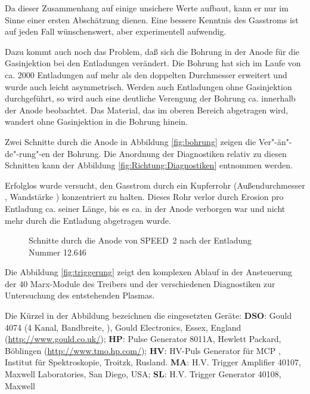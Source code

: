 \par
Da dieser Zusammenhang auf einige unsichere Werte aufbaut, kann er nur
im Sinne einer ersten Abschätzung dienen. Eine bessere Kenntnis des
Gasstroms ist auf jeden Fall wünschenswert, aber experimentell
aufwendig.
\par
Dazu kommt auch noch das Problem, daß sich die Bohrung in der Anode für
die Gasinjektion bei den Entladungen verändert. Die Bohrung hat sich im
Laufe von ca. 2000 Entladungen auf mehr als den doppelten Durchmesser
erweitert und wurde auch leicht asymmetrisch. Werden auch Entladungen
ohne Gasinjektion durchgeführt, so wird auch eine deutliche Verengung
der Bohrung ca.  innerhalb der Anode beobachtet. Das
Material, das im oberen Bereich abgetragen wird, wandert ohne
Gasinjektion in die Bohrung hinein.
\par
Zwei Schnitte durch die Anode in Abbildung \vref{fig:bohrung}
zeigen die Ver"-än"-de"-rung"-en der Bohrung. Die Anordnung der
Diagnostiken relativ zu diesen Schnitten kann der Abbildung
\vref{fig:Richtung:Diagnostiken} entnommen werden.
\par
Erfolglos wurde versucht, den Gasstrom durch ein Kupferrohr
(Außendurchmesser , Wandstärke )
konzentriert zu halten. Dieses Rohr verlor durch Erosion pro
Entladung ca.  seiner Länge, bis es ca. 
in der Anode verborgen war und nicht mehr durch die Entladung
abgetragen wurde.
%
\par
\begin{figure}[H]
  \center
  \caption{Schnitte durch die Anode von SPEED~2 nach der Entladung Nummer 12.646}
  \label{fig:bohrung}
\end{figure}
%
%
%
\par
Die Abbildung \vref{fig:triggerung} zeigt den komplexen Ablauf in der
Ansteuerung der 40 Marx-Module des Treibers und der verschiedenen Diagnostiken
zur Untersuchung des entstehenden Plasmas.
\par
Die Kürzel in der Abbildung bezeichnen die eingesetzten Geräte:
 {\bf DSO}: Gould 4074 (4 Kanal,  Bandbreite,
), Gould Electronics, Essex, England
(\url{http://www.gould.co.uk/});
 {\bf HP}: Pulse Generator 8011A,
Hewlett Packard, Böblingen (\url{http://www.tmo.hp.com/});
 {\bf HV}: HV-Puls Generator für MCP
\cite{sopkin:92}, Institut für Spektroskopie, Troitzk, Rusland.
 {\bf MA}: H.V. Trigger Amplifier 40107, Maxwell Laboratories, San
Diego, USA;
 {\bf SL}: H.V. Trigger Generator 40108, Maxwell

